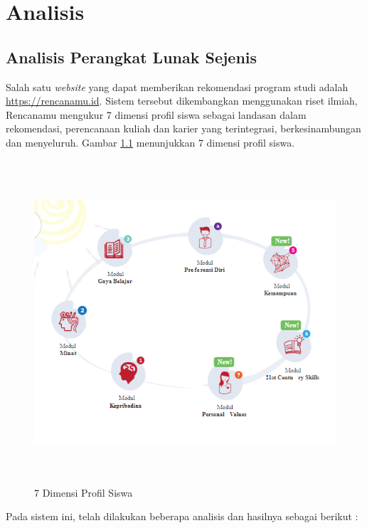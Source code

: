 \chapter{Analisis}
\label{chap:analisis}

\section{Analisis Perangkat Lunak Sejenis}
\label{sec:analisis pl}

Salah satu \textit{website} yang dapat memberikan rekomendasi program studi adalah \url{https://rencanamu.id}. Sistem tersebut dikembangkan menggunakan riset ilmiah, Rencanamu mengukur 7 dimensi profil siswa sebagai landasan dalam rekomendasi, perencanaan kuliah dan karier yang terintegrasi, berkesinambungan dan menyeluruh. Gambar \ref{gambar31} menunjukkan 7 dimensi profil siswa. %

\begin{figure}[H]
    \centering
    \includegraphics[width = 12cm, height = 12cm]{Gambar/gambar31.PNG}
    \caption{7 Dimensi Profil Siswa}
    \label{gambar31}
\end{figure}

Pada sistem ini, telah dilakukan beberapa analisis dan hasilnya sebagai berikut :

